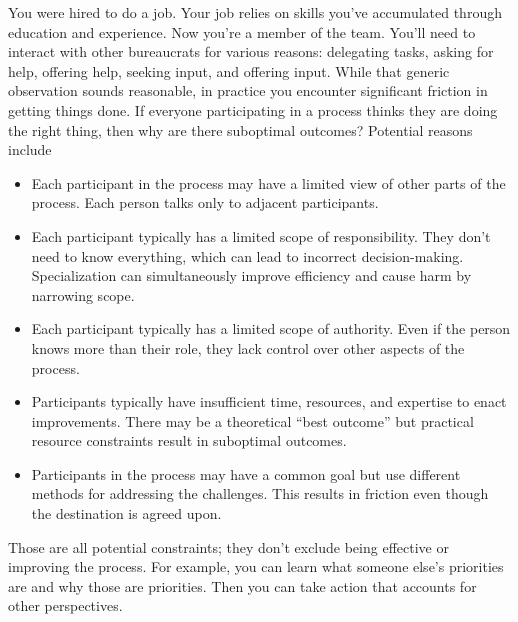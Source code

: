 You were hired to do a job. Your job relies on skills you've accumulated through education and experience. Now you're a member of 
 the team. You'll need to interact with other bureaucrats for various reasons:
delegating tasks, asking for help, offering help, seeking input, and offering input.
While that generic observation sounds reasonable, in practice you encounter significant friction in getting things done. 
If everyone participating in a process thinks they are doing the right thing, then why are there suboptimal outcomes? Potential reasons include
\begin{itemize}
    \item Each participant in the process may have a limited view of other parts of the process. Each person talks only to adjacent participants.
    \item Each participant typically has a limited scope of responsibility. They don't need to know everything, which can lead to incorrect decision-making. Specialization can simultaneously improve efficiency and cause harm by narrowing scope.
    \item Each participant typically has a limited scope of authority. Even if the person knows more than  their role, they lack control over other aspects of the process.
    \item Participants typically have insufficient time, resources, and expertise to enact improvements. There may be a theoretical ``best outcome'' but practical resource constraints result in suboptimal outcomes.
    \item Participants in the process may have a common goal but use different methods for addressing the challenges. This results in friction even though the destination is agreed upon. 
\end{itemize}
Those are all potential constraints; they don't exclude being effective or improving the process. 
For example, you can learn what someone else's priorities are and why those are priorities. Then you can take action that accounts for other perspectives.

